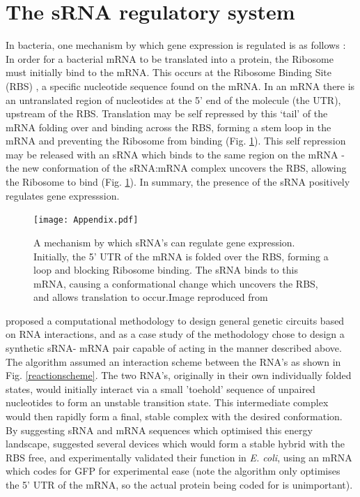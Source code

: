 \documentclass[10pt,journal]{./IEEE_latex_class/IEEEtran}
\begin{document}
\section{The sRNA regulatory system}
\label{The sRNA regulatory system}
In bacteria, one mechanism by which gene expression is regulated is as follows \cite{Soper2010}: In order for a bacterial mRNA to be translated into a protein, the Ribosome must initially bind to the mRNA. This occurs at the Ribosome Binding Site (RBS) \cite{Shine1974}, a specific nucleotide sequence found on the mRNA. In an mRNA there is an untranslated region of nucleotides at the 5' end of the molecule (the UTR), upstream of the RBS. Translation may be self repressed by this `tail' of the mRNA folding over and binding across the RBS, forming a stem loop in the mRNA and preventing the Ribosome from binding (Fig. \ref{RBS}). This self repression may be released with an sRNA which binds to the same region on the mRNA - the new conformation of the sRNA:mRNA complex uncovers the RBS, allowing the Ribosome to bind (Fig. \ref{RBS}). In summary, the presence of the sRNA positively regulates gene expresssion.

\begin{figure}[H]
\centering
\texttt{[image: Appendix.pdf]}
\caption{A mechanism by which sRNA's can regulate gene expression. Initially, the 5' UTR of the mRNA is folded over the RBS, forming a loop and blocking Ribosome binding. The sRNA binds to this mRNA, causing a conformational change which uncovers the RBS, and allows translation to occur.Image reproduced from \cite{Rodrigo2012} }
\label{RBS}
\end{figure}

\cite{Rodrigo2012} proposed a computational methodology to design general genetic circuits based on RNA interactions, and as a case study of the methodology chose to design a synthetic sRNA- mRNA pair capable of acting in the manner described above. The algorithm assumed an interaction scheme between the RNA's as shown in Fig. \ref{reactionscheme}. The two RNA's, originally in their own individually folded states, would initially interact via a small 'toehold' sequence of unpaired nucleotides to form an unstable transition state. This intermediate complex would then rapidly form a final, stable complex with the desired conformation. By suggesting sRNA and mRNA sequences which optimised this energy landscape, \cite{Rodrigo2012} suggested several devices which would form a stable hybrid with the RBS free, and experimentally validated their function in \textit{E. coli}, using an mRNA which codes for GFP for experimental ease (note the algorithm only optimises the 5' UTR of the mRNA, so the actual protein being coded for is unimportant).
\end{document}
